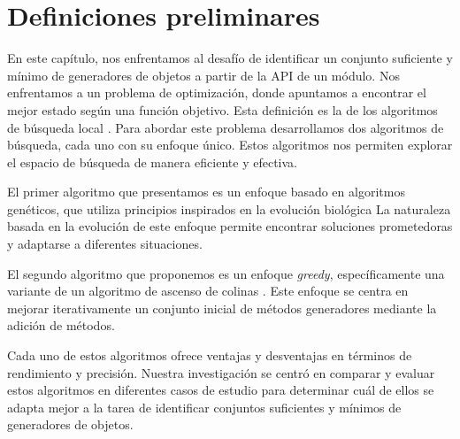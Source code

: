 
\section{Definiciones preliminares}
\label{sec:preliminares}


En este capítulo, nos enfrentamos al desafío de identificar un conjunto suficiente y mínimo de generadores de objetos a partir de la API de un módulo. 
Nos enfrentamos a un problema de optimización, donde apuntamos a encontrar el mejor estado según una función objetivo.
Esta definición es la de los algoritmos de búsqueda local \cite{Russell:2009}.
Para abordar este problema desarrollamos dos algoritmos de búsqueda, cada uno con su enfoque único. Estos algoritmos nos permiten explorar el espacio de búsqueda de manera eficiente y efectiva.

El primer algoritmo que presentamos es un enfoque basado en algoritmos genéticos, que utiliza principios inspirados en la evolución biológica \cite{Goldberg:1989}
La naturaleza basada en la evolución de este enfoque permite encontrar soluciones prometedoras y adaptarse a diferentes situaciones.

El segundo algoritmo que proponemos es un enfoque \emph{greedy}, específicamente una variante de un algoritmo de ascenso de colinas \cite{Russell:2009,Cormen2009}. Este enfoque se centra en mejorar iterativamente un conjunto inicial de métodos generadores mediante la adición de métodos.


Cada uno de estos algoritmos ofrece ventajas y desventajas en términos de rendimiento y precisión. Nuestra investigación se centró en comparar y evaluar estos algoritmos en diferentes casos de estudio para determinar cuál de ellos se adapta mejor a la tarea de identificar conjuntos suficientes y mínimos de generadores de objetos.

